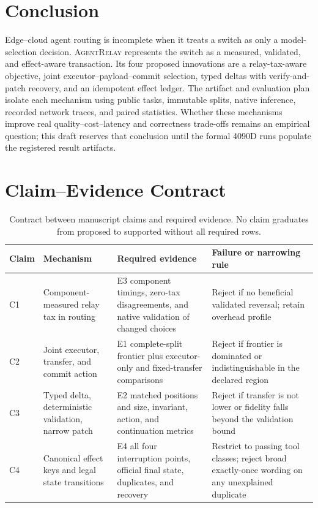 \documentclass[10pt]{article}
\newcommand{\system}{\textsc{AgentRelay}}
\begin{document}
\section{Conclusion}
\label{sec:conclusion}

Edge--cloud agent routing is incomplete when it treats a switch as only a
model-selection decision. \system{} represents the switch as a measured,
validated, and effect-aware transaction. Its four proposed innovations are a
relay-tax-aware objective, joint executor--payload--commit selection, typed
deltas with verify-and-patch recovery, and an idempotent effect ledger. The
artifact and evaluation plan isolate each mechanism using public tasks,
immutable splits, native inference, recorded network traces, and paired
statistics. Whether these mechanisms improve real quality--cost--latency and
correctness trade-offs remains an empirical question; this draft reserves
that conclusion until the formal 4090D runs populate the registered result
artifacts.

\appendix

\section{Claim--Evidence Contract}
\label{app:claims}

\begin{table}[h]
\centering
\small
\caption{Contract between manuscript claims and required evidence. No claim
graduates from proposed to supported without all required rows.}
\label{tab:claim-contract}
\begin{tabular}{p{}p{}p{}p{}}
\toprule
Claim & Mechanism & Required evidence & Failure or narrowing rule \\
\midrule
C1 & Component-measured relay tax in routing &
E3 component timings, zero-tax disagreements, and native validation of changed
choices & Reject if no beneficial validated reversal; retain overhead profile \\
C2 & Joint executor, transfer, and commit action &
E1 complete-split frontier plus executor-only and fixed-transfer comparisons &
Reject if frontier is dominated or indistinguishable in the declared region \\
C3 & Typed delta, deterministic validation, narrow patch &
E2 matched positions and size, invariant, action, and continuation metrics &
Reject if transfer is not lower or fidelity falls beyond the validation bound \\
C4 & Canonical effect keys and legal state transitions &
E4 all four interruption points, official final state, duplicates, and recovery &
Restrict to passing tool classes; reject broad exactly-once wording on any
unexplained duplicate \\
\bottomrule
\end{tabular}
\end{table}
\end{document}
